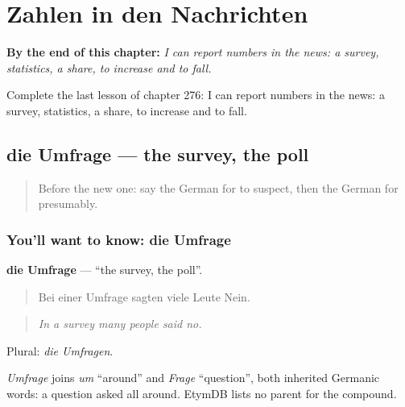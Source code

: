 
\chapter{Zahlen in den Nachrichten}
\label{ch:ge-zahlen-in-den-nachrichten}

\begin{chapteropening}
\textbf{By the end of this chapter:} \emph{I can report numbers in the news: a survey, statistics, a share, to increase and to fall.}

Complete the last lesson of chapter 276: I can report numbers in the news: a survey, statistics, a share, to increase and to fall.
\end{chapteropening}

\section[die Umfrage]{die Umfrage — the survey, the poll}

\label{lesson:GE-C276-umfrage}



\begin{quote}
Before the new one: say the German for to suspect, then the German for presumably.
\end{quote}

\subsection*{You'll want to know: die Umfrage}
\textbf{die Umfrage} — \textquotedblleft{}the survey, the poll\textquotedblright{}.

\begin{quote}
Bei einer Umfrage sagten viele Leute Nein.
\end{quote}

\begin{quote}
\emph{In a survey many people said no.}
\end{quote}

Plural: \emph{die Umfragen}.

\begin{cousinweb}
\emph{Umfrage} joins \emph{um} \textquotedblleft{}around\textquotedblright{} and \emph{Frage} \textquotedblleft{}question\textquotedblright{}, both inherited Germanic words: a question asked all around. EtymDB lists no parent for the compound.
\end{cousinweb}

